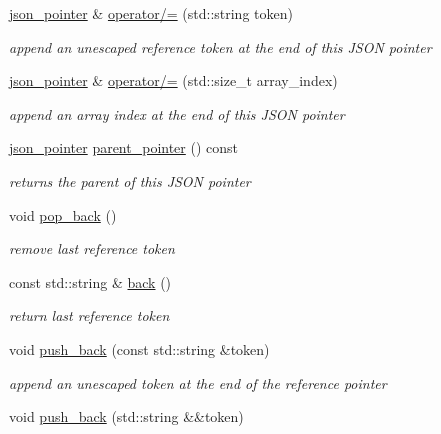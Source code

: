 \begin{DoxyCompactItemize}
\mbox{\hyperlink{classnlohmann_1_1json__pointer}{json\+\_\+pointer}} \& \mbox{\hyperlink{classnlohmann_1_1json__pointer_abdd21567b2b1d69329af0f520335e68b}{operator/=}} (std\+::string token)
\begin{DoxyCompactList}\small\item\em append an unescaped reference token at the end of this J\+S\+ON pointer \end{DoxyCompactList}\item 
\mbox{\hyperlink{classnlohmann_1_1json__pointer}{json\+\_\+pointer}} \& \mbox{\hyperlink{classnlohmann_1_1json__pointer_a64c8401529131bad1e486d91d703795f}{operator/=}} (std\+::size\+\_\+t array\+\_\+index)
\begin{DoxyCompactList}\small\item\em append an array index at the end of this J\+S\+ON pointer \end{DoxyCompactList}\item 
\mbox{\hyperlink{classnlohmann_1_1json__pointer}{json\+\_\+pointer}} \mbox{\hyperlink{classnlohmann_1_1json__pointer_afdaacce1edb7145e0434e014f0e8685a}{parent\+\_\+pointer}} () const
\begin{DoxyCompactList}\small\item\em returns the parent of this J\+S\+ON pointer \end{DoxyCompactList}\item 
void \mbox{\hyperlink{classnlohmann_1_1json__pointer_a4b1ee4d511ca195bed896a3da47e264c}{pop\+\_\+back}} ()
\begin{DoxyCompactList}\small\item\em remove last reference token \end{DoxyCompactList}\item 
const std\+::string \& \mbox{\hyperlink{classnlohmann_1_1json__pointer_a6bd5b554c10f15672135c216893eef31}{back}} ()
\begin{DoxyCompactList}\small\item\em return last reference token \end{DoxyCompactList}\item 
void \mbox{\hyperlink{classnlohmann_1_1json__pointer_a697d12b5bd6205f8866691b166b7c7dc}{push\+\_\+back}} (const std\+::string \&token)
\begin{DoxyCompactList}\small\item\em append an unescaped token at the end of the reference pointer \end{DoxyCompactList}\item 
void \mbox{\hyperlink{classnlohmann_1_1json__pointer_ac228b13596d3c34185da9fe61b570194}{push\+\_\+back}} (std\+::string \&\&token)

\end{DoxyCompactItemize}
